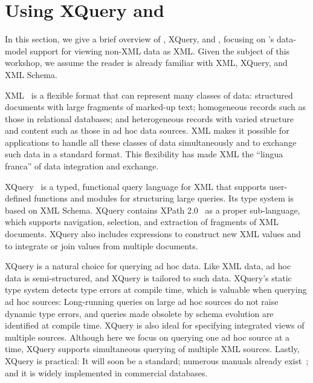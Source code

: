 \section{Using XQuery and \Galax{}}
\label{section:galax}

In this section, we give a brief overview of \Xml{}, XQuery, and
\Galax{}, focusing on \Galax{}'s data-model support for viewing
non-XML data as XML.  Given the subject of this workshop, we assume
the reader is already familiar with XML, XQuery, and XML Schema.

XML~\cite{xml10} is a flexible format that can represent many classes
of data: structured documents with large fragments of marked-up text;
homogeneous records such as those in relational databases; and
heterogeneous records with varied structure and content such as those
in ad hoc data sources.  XML makes it possible for applications to
handle all these classes of data simultaneously and to exchange such
data in a standard format.  This flexibility has made XML the ``lingua
franca'' of data integration and exchange.

XQuery~\cite{xquery10} is a typed, functional query language for XML
that supports user-defined functions and modules for structuring large
queries.  Its type system is based on XML Schema.  XQuery contains
XPath 2.0~\cite{xpath20} as a proper sub-language, which supports
navigation, selection, and extraction of fragments of XML documents.
XQuery also includes expressions to construct new XML values and to
integrate or join values from multiple documents.  

XQuery is a natural choice for querying ad hoc data.  Like XML data,
ad hoc data is semi-structured, and XQuery is tailored to 
such data.  
XQuery's static type system detects type errors at compile time, which
is valuable when querying ad hoc sources: Long-running queries on
large ad hoc sources do not raise dynamic type errors, and queries
made obsolete by schema evolution are identified at compile time.
XQuery is also ideal for specifying integrated views of multiple
sources.  Although here we focus on querying one ad hoc source at a
time, XQuery supports simultaneous querying of multiple 
XML sources. Lastly, XQuery is practical: It will soon be a
standard; numerous manuals already exist~\cite{brundage2004}; and it is widely implemented
in commercial databases.

